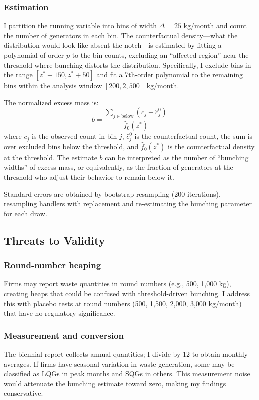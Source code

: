 \documentclass[12pt]{article}
\begin{document}
\subsubsection*{Estimation} I partition the running variable into bins of width $\Delta = 25$ kg/month and count the number of generators in each bin. The counterfactual density---what the distribution would look like absent the notch---is estimated by fitting a polynomial of order $p$ to the bin counts, excluding an ``affected region'' near the threshold where bunching distorts the distribution. Specifically, I exclude bins in the range $[z^* - 150, z^* + 50]$ and fit a 7th-order polynomial to the remaining bins within the analysis window $[200, 2{,}500]$ kg/month.

The normalized excess mass is:
\begin{equation}
b = \frac{\sum_{j \in \text{below}} (c_j - \hat{c}_j^0)}{\hat{f}_0(z^*)}
\label{eq:excess_mass}
\end{equation}
where $c_j$ is the observed count in bin $j$, $\hat{c}_j^0$ is the counterfactual count, the sum is over excluded bins below the threshold, and $\hat{f}_0(z^*)$ is the counterfactual density at the threshold. The estimate $b$ can be interpreted as the number of ``bunching widths'' of excess mass, or equivalently, as the fraction of generators at the threshold who adjust their behavior to remain below it.

Standard errors are obtained by bootstrap resampling (200 iterations), resampling handlers with replacement and re-estimating the bunching parameter for each draw.

\subsection{Threats to Validity}

\subsubsection*{Round-number heaping} Firms may report waste quantities in round numbers (e.g., 500, 1,000 kg), creating heaps that could be confused with threshold-driven bunching. I address this with placebo tests at round numbers (500, 1,500, 2,000, 3,000 kg/month) that have no regulatory significance.

\subsubsection*{Measurement and conversion} The biennial report collects annual quantities; I divide by 12 to obtain monthly averages. If firms have seasonal variation in waste generation, some may be classified as LQGs in peak months and SQGs in others. This measurement noise would attenuate the bunching estimate toward zero, making my findings conservative.
\end{document}
